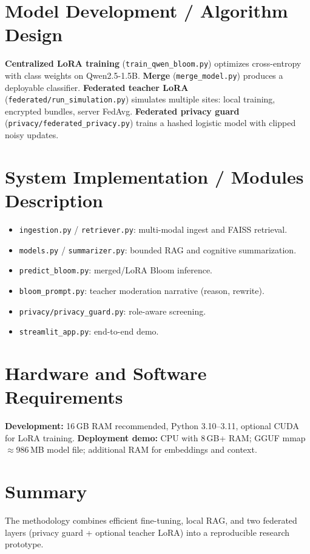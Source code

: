 \section{Model Development / Algorithm Design}
\textbf{Centralized LoRA training} (\texttt{train\_qwen\_bloom.py}) optimizes cross-entropy with class weights on Qwen2.5-1.5B. \textbf{Merge} (\texttt{merge\_model.py}) produces a deployable classifier. \textbf{Federated teacher LoRA} (\texttt{federated/run\_simulation.py}) simulates multiple sites: local training, encrypted bundles, server FedAvg. \textbf{Federated privacy guard} (\texttt{privacy/federated\_privacy.py}) trains a hashed logistic model with clipped noisy updates.

\section{System Implementation / Modules Description}
\begin{itemize}
    \item \texttt{ingestion.py} / \texttt{retriever.py}: multi-modal ingest and FAISS retrieval.
    \item \texttt{models.py} / \texttt{summarizer.py}: bounded RAG and cognitive summarization.
    \item \texttt{predict\_bloom.py}: merged/LoRA Bloom inference.
    \item \texttt{bloom\_prompt.py}: teacher moderation narrative (reason, rewrite).
    \item \texttt{privacy/privacy\_guard.py}: role-aware screening.
    \item \texttt{streamlit\_app.py}: end-to-end demo.
\end{itemize}

\section{Hardware and Software Requirements}
\textbf{Development:} 16\,GB RAM recommended, Python 3.10--3.11, optional CUDA for LoRA training. \textbf{Deployment demo:} CPU with 8\,GB+ RAM; GGUF mmap $\approx$986\,MB model file; additional RAM for embeddings and context.

\section{Summary}
The methodology combines efficient fine-tuning, local RAG, and two federated layers (privacy guard + optional teacher LoRA) into a reproducible research prototype.
